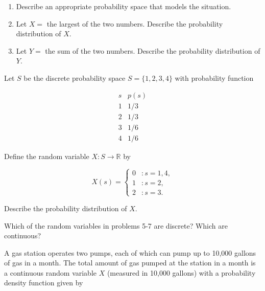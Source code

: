 \documentclass[12pt,reqno]{amsart}
\begin{document}
\medskip
\begin{enumerate}
\item Describe an appropriate probability space that models the situation.\vfill
\item Let $X = $ the largest of the two numbers. Describe the probability distribution of $X$.\vfill
\item Let $Y = $ the sum of the two numbers. Describe the probability distribution of $Y$.\vfill
\end{enumerate}















\bigskip
\prob Let $S$ be the discrete probability space $S = \{1,2,3,4\}$ with probability function

	\[
	\begin{array}{c|c}
	s & p(s) \\ \hline
	1 & 1/3\\
	2 & 1/3\\
	3 & 1/6\\
	4 & 1/6
	\end{array}
	\]

Define the random variable $X:S\to \mathbb{R}$ by

	\[
	X(s) = \begin{cases}
	0 & : s = 1, 4, \\
	1 & : s=2, \\
	2 & : s=3.
	\end{cases}
	\]

Describe the probability distribution of $X$.\vfill












\newpage
\prob Which of the random variables in problems 5-7 are discrete? Which are continuous?\vfill















\bigskip
\prob A gas station operates two pumps, each of which can pump up to 10,000 gallons of gas in a month. The total amount of gas pumped at the station in a month is a continuous random variable $X$ (measured in 10,000 gallons) with a probability density function given by
\end{document}
